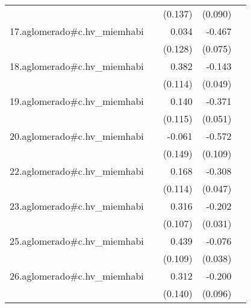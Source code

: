 {\begin{longtable}{l*{4}{D{.}{.}{-1}}}
            &                     &     (0.137)         &     (0.090)         &                     \\
\addlinespace
17.aglomerado#c.hv\_miemhabi&                     &       0.034         &      -0.467\sym{***}&                     \\
            &                     &     (0.128)         &     (0.075)         &                     \\
\addlinespace
18.aglomerado#c.hv\_miemhabi&                     &       0.382\sym{***}&      -0.143\sym{**} &                     \\
            &                     &     (0.114)         &     (0.049)         &                     \\
\addlinespace
19.aglomerado#c.hv\_miemhabi&                     &       0.140         &      -0.371\sym{***}&                     \\
            &                     &     (0.115)         &     (0.051)         &                     \\
\addlinespace
20.aglomerado#c.hv\_miemhabi&                     &      -0.061         &      -0.572\sym{***}&                     \\
            &                     &     (0.149)         &     (0.109)         &                     \\
\addlinespace
22.aglomerado#c.hv\_miemhabi&                     &       0.168         &      -0.308\sym{***}&                     \\
            &                     &     (0.114)         &     (0.047)         &                     \\
\addlinespace
23.aglomerado#c.hv\_miemhabi&                     &       0.316\sym{**} &      -0.202\sym{***}&                     \\
            &                     &     (0.107)         &     (0.031)         &                     \\
\addlinespace
25.aglomerado#c.hv\_miemhabi&                     &       0.439\sym{***}&      -0.076\sym{*}  &                     \\
            &                     &     (0.109)         &     (0.038)         &                     \\
\addlinespace
26.aglomerado#c.hv\_miemhabi&                     &       0.312\sym{*}  &      -0.200\sym{*}  &                     \\
            &                     &     (0.140)         &     (0.096)         &                     \\

\end{longtable}}
